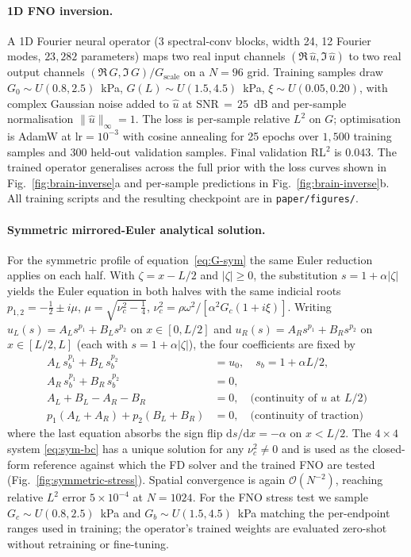 \documentclass[11pt,letterpaper]{article}
\begin{document}
\paragraph{1D FNO inversion.}
\label{sec:methods-1d-fno}
A 1D Fourier neural operator (3 spectral-conv blocks, width 24, 12
Fourier modes, $23{,}282$ parameters) maps two real input channels
$(\Re\,\hat u, \Im\,\hat u)$ to two real output channels
$(\Re\,G, \Im\,G)/G_{\mathrm{scale}}$ on a $N=96$ grid. Training samples
draw $G_{0}\!\sim\!U(0.8,2.5)$~kPa, $G(L)\!\sim\!U(1.5,4.5)$~kPa,
$\xi\!\sim\!U(0.05,0.20)$, with complex Gaussian noise added to $\hat u$ at
SNR$\,=\,25$~dB and per-sample normalisation $\|\hat u\|_{\infty}=1$. The
loss is per-sample relative $L^{2}$ on $G$; optimisation is AdamW at
$\mathrm{lr}=10^{-3}$ with cosine annealing for 25 epochs over
$1{,}500$ training samples and $300$ held-out validation samples. Final
validation RL$^{2}$ is $0.043$. The trained operator generalises across
the full prior with the loss curves shown in
Fig.~\ref{fig:brain-inverse}a and per-sample predictions in
Fig.~\ref{fig:brain-inverse}b. All training scripts and the resulting
checkpoint are in \texttt{paper/figures/}.

\paragraph{Symmetric mirrored-Euler analytical solution.}
\label{sec:methods-1d-sym}
For the symmetric profile of equation~\eqref{eq:G-sym} the same Euler
reduction applies on each half. With $\zeta = x - L/2$ and $|\zeta| \ge 0$,
the substitution $s = 1+\alpha|\zeta|$ yields the Euler equation in both
halves with the same indicial roots $p_{1,2}=-\tfrac{1}{2}\pm i\mu$,
$\mu=\sqrt{\nu_{c}^{2}-\tfrac{1}{4}}$, $\nu_{c}^{2}=\rho\omega^{2}/[\alpha^{2}G_{c}(1+i\xi)]$.
Writing
$u_{L}(s)=A_{L}s^{p_{1}}+B_{L}s^{p_{2}}$ on $x\in[0,L/2]$ and
$u_{R}(s)=A_{R}s^{p_{1}}+B_{R}s^{p_{2}}$ on $x\in[L/2,L]$ (each with
$s=1+\alpha|\zeta|$), the four coefficients are fixed by
\begin{align}
A_{L}\,s_{b}^{p_{1}} + B_{L}\,s_{b}^{p_{2}} &= u_{0}, \quad s_{b}=1+\alpha L/2,\nonumber\\
A_{R}\,s_{b}^{p_{1}} + B_{R}\,s_{b}^{p_{2}} &= 0,\nonumber\\
A_{L} + B_{L} - A_{R} - B_{R} &= 0,\quad\text{(continuity of }u\text{ at }L/2)\nonumber\\
p_{1}(A_{L}+A_{R}) + p_{2}(B_{L}+B_{R}) &= 0,\quad\text{(continuity of traction)}
\label{eq:sym-bc}
\end{align}
where the last equation absorbs the sign flip
$\mathrm{d}s/\mathrm{d}x = -\alpha$ on $x<L/2$. The $4\!\times\!4$ system
\eqref{eq:sym-bc} has a unique solution for any $\nu_{c}^{2}\neq 0$ and is
used as the closed-form reference against which the FD solver and the
trained FNO are tested (Fig.~\ref{fig:symmetric-stress}). Spatial
convergence is again $\mathcal{O}(N^{-2})$, reaching relative $L^{2}$
error $5\!\times\!10^{-4}$ at $N=1024$. For the FNO stress test we
sample $G_{c}\!\sim\!U(0.8,2.5)$~kPa and $G_{b}\!\sim\!U(1.5,4.5)$~kPa
matching the per-endpoint ranges used in training; the operator's
trained weights are evaluated zero-shot without retraining or
fine-tuning.
\end{document}
